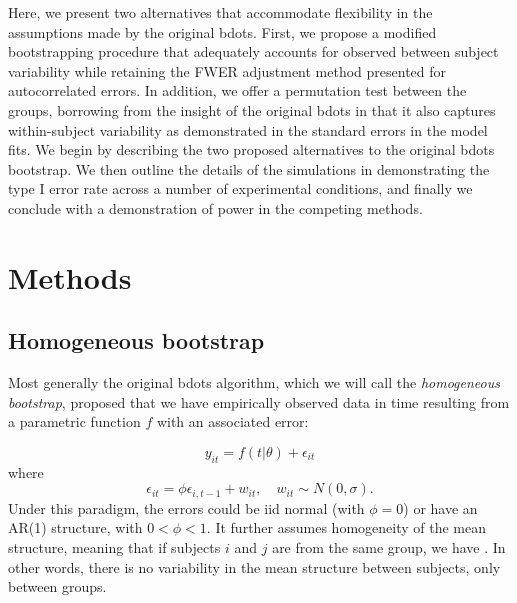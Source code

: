 Here, we present two alternatives that accommodate flexibility in the assumptions made by the original bdots. First, we propose a modified bootstrapping procedure that adequately accounts for observed between subject variability while retaining the FWER adjustment method presented for autocorrelated errors. In addition, we offer a permutation test between the groups, borrowing from the insight of the original bdots in that it also captures within-subject variability as demonstrated in the standard errors in the model fits. We begin by describing the two proposed alternatives to the original bdots bootstrap. We then outline the details of the simulations in demonstrating the type I error rate across a number of experimental conditions, and finally we conclude with a demonstration of power in the competing methods.

\section{Methods}


\subsection{Homogeneous bootstrap}

 Most generally the original bdots algorithm, which we will call the \textit{homogeneous bootstrap}, proposed that we have empirically observed data in time resulting from a parametric function $f$ with an associated error: 

\begin{equation}\label{eq:mean_structure}
y_{it} = f(t|\theta) + \epsilon_{it}
\end{equation}
where 
\begin{equation}
\epsilon_{it} = \phi \epsilon_{i, t-1} + w_{it}, \quad w_{it} \sim N(0, \sigma).
\end{equation}
Under this paradigm, the errors could be iid normal (with $\phi = 0$) or have an AR(1) structure, with $0 < \phi < 1$. It further assumes homogeneity of the mean structure, meaning that if subjects $i$ and $j$ are from the same group, we have . In other words, there is no variability in the mean structure between subjects, only between groups. 

